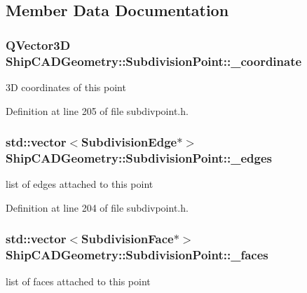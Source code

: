 \subsection{Member Data Documentation}
\hypertarget{classShipCADGeometry_1_1SubdivisionPoint_a7150fdf34fce9bc242b2266313c1c313}{
\subsubsection[{\-\_\-coordinate}]{\setlength{\rightskip}{0pt plus 5cm}Q\-Vector3\-D Ship\-C\-A\-D\-Geometry\-::\-Subdivision\-Point\-::\-\_\-coordinate\hspace{0.3cm}{\ttfamily [protected]}}}\label{classShipCADGeometry_1_1SubdivisionPoint_a7150fdf34fce9bc242b2266313c1c313}
3\-D coordinates of this point 

Definition at line 205 of file subdivpoint.\-h.

\hypertarget{classShipCADGeometry_1_1SubdivisionPoint_a1ee85e0a7815d8d737dcd6f654bf15a5}{
\subsubsection[{\-\_\-edges}]{\setlength{\rightskip}{0pt plus 5cm}std\-::vector$<${\bf Subdivision\-Edge}$\ast$$>$ Ship\-C\-A\-D\-Geometry\-::\-Subdivision\-Point\-::\-\_\-edges\hspace{0.3cm}{\ttfamily [protected]}}}\label{classShipCADGeometry_1_1SubdivisionPoint_a1ee85e0a7815d8d737dcd6f654bf15a5}
list of edges attached to this point 

Definition at line 204 of file subdivpoint.\-h.

\hypertarget{classShipCADGeometry_1_1SubdivisionPoint_aa6e398141f2b296763548ecdf904d200}{
\subsubsection[{\-\_\-faces}]{\setlength{\rightskip}{0pt plus 5cm}std\-::vector$<${\bf Subdivision\-Face}$\ast$$>$ Ship\-C\-A\-D\-Geometry\-::\-Subdivision\-Point\-::\-\_\-faces\hspace{0.3cm}{\ttfamily [protected]}}}\label{classShipCADGeometry_1_1SubdivisionPoint_aa6e398141f2b296763548ecdf904d200}
list of faces attached to this point 


